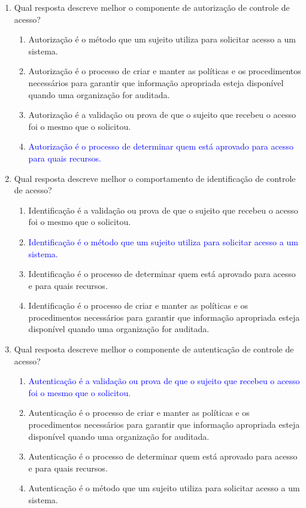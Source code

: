\documentclass{report}
\begin{document}
	\begin{enumerate}
		\item Qual resposta descreve melhor o componente de autorização de controle de acesso?
		\begin{enumerate}[label=(\alph*)]
			\item Autorização é o método que um sujeito utiliza para solicitar acesso a um sistema.
			\item Autorização é o processo de criar e manter as políticas e os procedimentos necessários para garantir que informação apropriada esteja disponível quando uma organização for auditada.
			\item Autorização é a validação ou prova de que o sujeito que recebeu o acesso foi o mesmo que o solicitou.
			\item \textcolor{blue}{Autorização é o processo de determinar quem está aprovado para acesso para quais recursos.}
		\end{enumerate}
		
		\item Qual resposta descreve melhor o comportamento de identificação de controle de acesso?
		\begin{enumerate}[label=(\alph*)]
			\item Identificação é a validação ou prova de que o sujeito que recebeu o acesso foi o mesmo que o solicitou.
			\item \textcolor{blue}{Identificação é o método que um sujeito utiliza para solicitar acesso a um sistema.}
			\item Identificação é o processo de determinar quem está aprovado para acesso e para quais recursos.
			\item Identificação é o processo de criar e manter as políticas e os procedimentos necessários para garantir que informação apropriada esteja disponível quando uma organização for auditada.
		\end{enumerate}
		
		\item Qual resposta descreve melhor o componente de autenticação de controle de acesso?
		\begin{enumerate}[label=(\alph*)]
			\item \textcolor{blue}{Autenticação é a validação ou prova de que o sujeito que recebeu o acesso foi o mesmo que o solicitou.}
			\item Autenticação é o processo de criar e manter as políticas e os procedimentos necessários para garantir que informação apropriada esteja disponível quando uma organização for auditada.
			\item Autenticação é o processo de determinar quem está aprovado para acesso e para quais recursos.
			\item Autenticação é o método que um sujeito utiliza para solicitar acesso a um sistema.
		\end{enumerate}
		

\end{enumerate}
\end{document}
